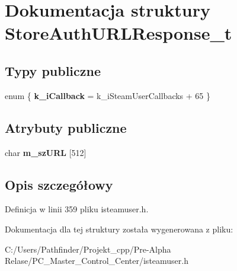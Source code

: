 \hypertarget{struct_store_auth_u_r_l_response__t}{}\section{Dokumentacja struktury Store\+Auth\+U\+R\+L\+Response\+\_\+t}
\label{struct_store_auth_u_r_l_response__t}
\subsection*{Typy publiczne}
\begin{DoxyCompactItemize}
\item 
\mbox{\label{struct_store_auth_u_r_l_response__t_a8232c0f5fef8b66ab2de4da4e2a036bc}} 
enum \{ {\bfseries k\+\_\+i\+Callback} = k\+\_\+i\+Steam\+User\+Callbacks + 65
 \}
\end{DoxyCompactItemize}
\subsection*{Atrybuty publiczne}
\begin{DoxyCompactItemize}
\item 
\mbox{\label{struct_store_auth_u_r_l_response__t_a8c9864ac521a1f7e815b2fa90d5a1745}} 
char {\bfseries m\+\_\+sz\+U\+RL} \mbox{[}512\mbox{]}
\end{DoxyCompactItemize}


\subsection{Opis szczegółowy}


Definicja w linii 359 pliku isteamuser.\+h.



Dokumentacja dla tej struktury została wygenerowana z pliku\+:\begin{DoxyCompactItemize}
\item 
C\+:/\+Users/\+Pathfinder/\+Projekt\+\_\+cpp/\+Pre-\/\+Alpha Relase/\+P\+C\+\_\+\+Master\+\_\+\+Control\+\_\+\+Center/isteamuser.\+h\end{DoxyCompactItemize}
